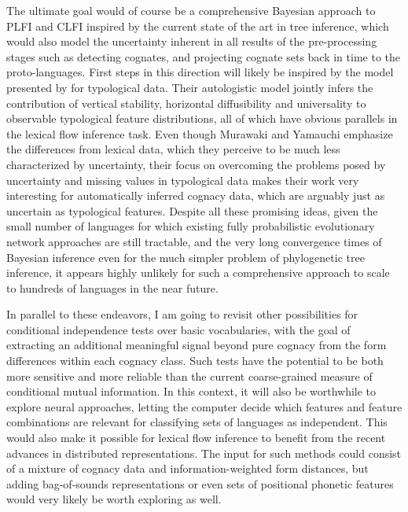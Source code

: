 The ultimate goal would of course be a comprehensive Bayesian approach to PLFI and CLFI inspired by the current state of the art in tree inference, which would also model the uncertainty inherent in all results of the pre-processing stages such as detecting cognates, and projecting cognate sets back in time to the proto-languages. First steps in this direction will likely be inspired by the model presented by \cite{murawaki_yamauchi_2018} for typological data. Their autologistic model jointly infers the contribution of vertical stability, horizontal diffusibility and universality to observable typological feature distributions, all of which have obvious parallels in the lexical flow inference task. Even though Murawaki and Yamauchi emphasize the differences from lexical data, which they perceive to be much less characterized by uncertainty, their focus on overcoming the problems posed by uncertainty and missing values in typological data makes their work very interesting for automatically inferred cognacy data, which are arguably just as uncertain as typological features. Despite all these promising ideas, given the small number of languages for which existing fully probabilistic evolutionary network approaches are still tractable, and the very long convergence times of Bayesian inference even for the much simpler problem of phylogenetic tree inference, it appears highly unlikely for such a comprehensive approach to scale to hundreds of languages in the near future.

In parallel to these endeavors, I am going to revisit other possibilities for conditional independence tests over basic vocabularies, with the goal of extracting an additional meaningful signal beyond pure cognacy from the form differences within each cognacy class. Such tests have the potential to be both more sensitive and more reliable than the current coarse-grained measure of conditional mutual information. In this context, it will also be worthwhile to explore neural approaches, letting the computer decide which features and feature combinations are relevant for classifying sets of languages as independent. This would also make it possible for lexical flow inference to benefit from the recent advances in distributed representations. The input for such methods could consist of a mixture of cognacy data and information-weighted form distances, but adding bag-of-sounds representations or even sets of positional phonetic features would very likely be worth exploring as well.

